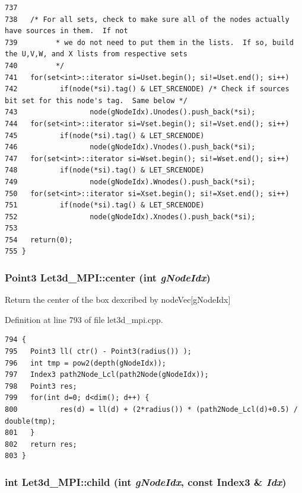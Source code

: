 \begin{verbatim}
737 
738   /* For all sets, check to make sure all of the nodes actually have sources in them.  If not
739         * we do not need to put them in the lists.  If so, build the U,V,W, and X lists from respective sets
740         */
741   for(set<int>::iterator si=Uset.begin(); si!=Uset.end(); si++)
742          if(node(*si).tag() & LET_SRCENODE) /* Check if sources bit set for this node's tag.  Same below */
743                 node(gNodeIdx).Unodes().push_back(*si);
744   for(set<int>::iterator si=Vset.begin(); si!=Vset.end(); si++)
745          if(node(*si).tag() & LET_SRCENODE)
746                 node(gNodeIdx).Vnodes().push_back(*si);
747   for(set<int>::iterator si=Wset.begin(); si!=Wset.end(); si++)
748          if(node(*si).tag() & LET_SRCENODE)
749                 node(gNodeIdx).Wnodes().push_back(*si);
750   for(set<int>::iterator si=Xset.begin(); si!=Xset.end(); si++)
751          if(node(*si).tag() & LET_SRCENODE)
752                 node(gNodeIdx).Xnodes().push_back(*si);
753   
754   return(0);
755 }
\end{verbatim}\normalsize 


\subsubsection{\setlength{\rightskip}{0pt plus 5cm}Point3 Let3d\_\-MPI::center (int {\em g\-Node\-Idx})}\label{classLet3d__MPI_dff5f922c11176af18f4bfa95c138a20_dff5f922c11176af18f4bfa95c138a20}


Return the center of the box dexcribed by node\-Vec[g\-Node\-Idx] 

Definition at line 793 of file let3d\_\-mpi.cpp.

\footnotesize\begin{verbatim}794 {
795   Point3 ll( ctr() - Point3(radius()) );
796   int tmp = pow2(depth(gNodeIdx));
797   Index3 path2Node_Lcl(path2Node(gNodeIdx));
798   Point3 res;
799   for(int d=0; d<dim(); d++) {
800          res(d) = ll(d) + (2*radius()) * (path2Node_Lcl(d)+0.5) / double(tmp);
801   }
802   return res;
803 }
\end{verbatim}\normalsize 


\subsubsection{\setlength{\rightskip}{0pt plus 5cm}int Let3d\_\-MPI::child (int {\em g\-Node\-Idx}, const Index3 \& {\em Idx})}\label{classLet3d__MPI_b0f154b8aff8346def992423c060b862_b0f154b8aff8346def992423c060b862}



